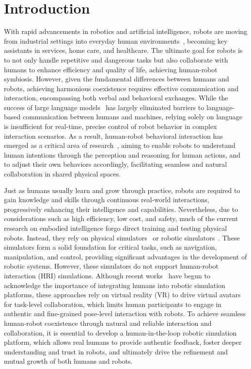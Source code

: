 \section{Introduction}
\label{sec:intro}

With rapid advancements in robotics and artificial intelligence, robots are moving from industrial settings into everyday human environments~\cite{lecun2022path,gonzalez2021service}, becoming key assistants in services, home care, and healthcare. The ultimate goal for robots is to not only handle repetitive and dangerous tasks but also collaborate with humans to enhance efficiency and quality of life, achieving human-robot symbiosis. However, given the fundamental differences between humans and robots, achieving harmonious coexistence requires effective communication and interaction, encompassing both verbal and behavioral exchanges. While the success of large language models~\cite{roumeliotis2023chatgpt,touvron2023llama} has largely eliminated barriers to language-based communication between humans and machines, relying solely on language is insufficient for real-time, precise control of robot behavior in complex interaction scenarios. As a result, human-robot behavioral interaction has emerged as a critical area of research~\cite{safavi2024emerging}, aiming to enable robots to understand human intentions through the perception and reasoning for human actions, and to adjust their own behaviors accordingly, facilitating seamless and natural collaboration in shared physical spaces.


Just as humans usually learn and grow through practice, robots are required to gain knowledge and skills through continuous real-world interactions, progressively enhancing their intelligence and capabilities. Nevertheless, due to considerations such as high efficiency, low cost, and safety, much of the current research on embodied intelligence forgo direct training and testing physical robots. Instead, they rely on physical simulators~\cite{makoviychuk2021isaac, todorov2012mujoco} or robotic simulators~\cite{igibson, nasiriany2024robocasa}. These simulators form a solid foundation for critical tasks, such as navigation, manipulation, and control, providing significant advantages in the development of robotic systems. However, these simulators do not support human-robot interaction (HRI) simulations. Although recent works~\cite{HumanTHOR, liu2024collabsphere} have begun to acknowledge the importance of integrating humans into robotic simulation platforms, these approaches rely on virtual reality (VR) to drive virtual avatars for task-level collaboration, which limits human participants to engage in authentic and fine-grained pose-level interaction with robots.
To achieve seamless human-robot coexistence through natural and reliable interaction and collaboration, it is essential to develop a human-in-the-loop robotic simulation platform, which allows real humans to provide authentic feedback, foster deeper understanding and trust in robots, and ultimately drive the refinement and mutual growth of both humans and robots.

